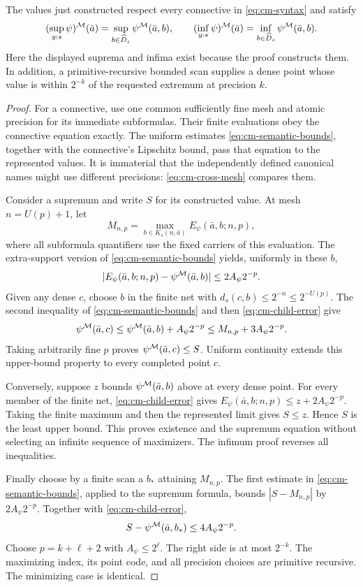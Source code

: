 \begin{theorem}
\label{thm:cm-adequacy}
The values just constructed respect every connective in
\eqref{eq:cm-syntax} and satisfy
\begin{equation}
 (\sup_{y:s}\psi)^\mathcal M(\bar a)
    =\sup_{b\in\widehat D_s}\psi^\mathcal M(\bar a,b),
 \qquad
 (\inf_{y:s}\psi)^\mathcal M(\bar a)
    =\inf_{b\in\widehat D_s}\psi^\mathcal M(\bar a,b).
 \label{eq:cm-adequacy}
\end{equation}
Here the displayed suprema and infima exist because the proof constructs
them. In addition, a primitive-recursive bounded scan supplies a dense
point whose value is within $2^{-k}$ of the requested extremum at
precision $k$.
\end{theorem}
\begin{proof}
For a connective, use one common sufficiently fine mesh and atomic
precision for its immediate subformulas. Their finite evaluations obey
the connective equation exactly. The uniform estimates
\eqref{eq:cm-semantic-bounds}, together with the connective's Lipschitz
bound, pass that equation to the represented values. It is immaterial
that the independently defined canonical names might use different
precisions: \eqref{eq:cm-cross-mesh} compares them.

Consider a supremum and write $S$ for its constructed value. At mesh
$n=U(p)+1$, let
\[
 M_{n,p}=\max_{b\in K_s(n,\bar a)}
                 E_\psi(\bar a,b;n,p),
\]
where all subformula quantifiers use the fixed carriers of this
evaluation. The extra-support version of
\eqref{eq:cm-semantic-bounds} yields, uniformly in these $b$,
\begin{equation}
 |E_\psi(\bar a,b;n,p)-\psi^\mathcal M(\bar a,b)|
       \leq 2A_\psi2^{-p}.
 \label{eq:cm-child-error}
\end{equation}
Given any dense $c$, choose $b$ in the finite net with
$d_s(c,b)\leq2^{-n}\leq2^{-U(p)}$.
The second inequality of \eqref{eq:cm-semantic-bounds} and then
\eqref{eq:cm-child-error} give
\[
 \psi^\mathcal M(\bar a,c)
 \leq\psi^\mathcal M(\bar a,b)+A_\psi2^{-p}
 \leq M_{n,p}+3A_\psi2^{-p}.
\]
Taking arbitrarily fine $p$ proves $\psi^\mathcal M(\bar a,c)\leq S$.
Uniform continuity extends this upper-bound property to every completed
point $c$.

Conversely, suppose $z$ bounds $\psi^\mathcal M(\bar a,b)$ above at every
dense point. For every member of the finite net,
\eqref{eq:cm-child-error} gives
$E_\psi(\bar a,b;n,p)\leq z+2A_\psi2^{-p}$.
Taking the finite maximum and then the represented limit gives
$S\leq z$. Hence $S$ is the least upper bound. This proves existence
and the supremum equation without selecting an infinite sequence of
maximizers. The infimum proof reverses all inequalities.

Finally choose by a finite scan a $b_*$ attaining $M_{n,p}$.
The first estimate in \eqref{eq:cm-semantic-bounds}, applied to the
supremum formula, bounds $|S-M_{n,p}|$ by $2A_\psi2^{-p}$.
Together with \eqref{eq:cm-child-error},
\[
 S-\psi^\mathcal M(\bar a,b_*)\leq4A_\psi2^{-p}.
\]
Choose $p=k+\ell+2$ with $A_\psi\leq2^\ell$. The right side is at most
$2^{-k}$. The maximizing index, its point code, and all precision
choices are primitive recursive. The minimizing case is identical.
\end{proof}

